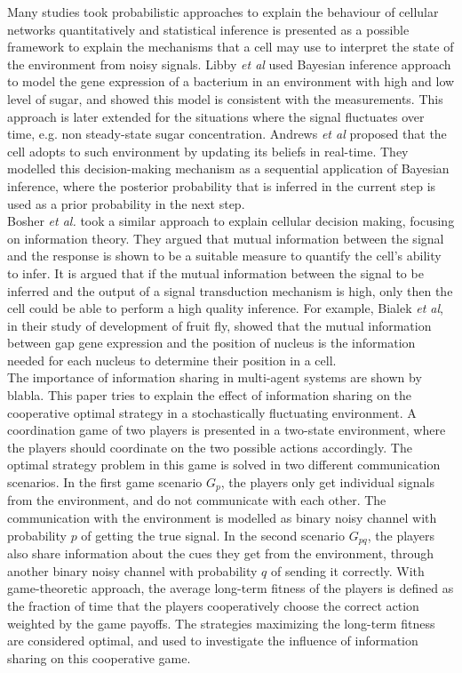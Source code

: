 Many studies took probabilistic approaches to explain the behaviour of cellular networks quantitatively and statistical inference is presented as a possible framework to explain the mechanisms that a cell may use to interpret the state of the environment from noisy signals. Libby \textit{et al} \cite{Libby2007} used Bayesian inference approach to model the gene expression of a bacterium in an environment with high and low level of sugar, and showed this model is consistent with the measurements. This approach is later extended for the situations where the signal fluctuates over time, e.g. non steady-state sugar concentration. Andrews \textit{et al} \cite{Andrews2016} proposed that the cell adopts to such environment by updating its beliefs in real-time. They modelled this decision-making mechanism as a sequential application of Bayesian inference, where the posterior probability that is inferred in the current step is used as a prior probability in the next step.\\
Bosher \textit{et al.} \cite{Bowsher2014} took a similar approach to explain cellular decision making, focusing on information theory. They argued that mutual information between the signal and the response is shown to be a suitable measure to quantify the cell's ability to infer. It is argued that if the mutual information between the signal to be inferred and the output of a signal transduction mechanism is high, only then the cell could be able to perform a high quality inference. For example, Bialek \textit{et al}, in their study of development of fruit fly, showed that the mutual information between gap gene expression and the position of nucleus is the information needed for each nucleus to determine their position in a cell. \\
The importance of information sharing in multi-agent systems are shown by blabla.
This paper tries to explain the effect of information sharing on the cooperative optimal strategy in a stochastically fluctuating environment. A coordination game of two players is presented in a two-state environment, where the players should coordinate on the two possible actions accordingly. The optimal strategy problem in this game is solved in two different communication scenarios. In the first game scenario $ G_{p} $, the players only get individual signals from the environment, and do not communicate with each other. The communication with the environment is modelled as binary noisy channel with probability $ p $ of getting the true signal. In the second scenario $ G_{pq} $, the players also share information about the cues they get from the environment, through another binary noisy channel with probability $ q $ of sending it correctly. With game-theoretic approach, the average long-term fitness of the players is defined as the fraction of time that the players cooperatively choose the correct action weighted by the game payoffs. The strategies maximizing the long-term fitness are considered optimal, and used to investigate the influence of information sharing on this cooperative game.


